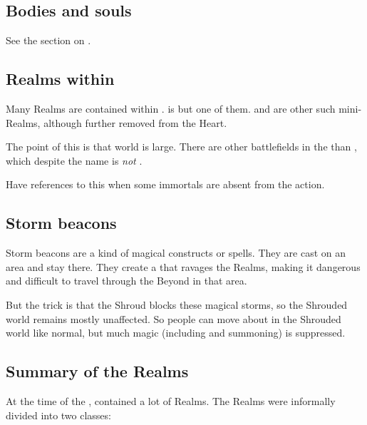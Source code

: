 \subsection{Bodies and souls}
See the section on . 









\subsection{Realms within \Miith}
Many Realms are contained within \Miith{}. 
 is but one of them. 
\Nyx{} and \Machai{} are other such mini-Realms, although further removed from the Heart. 

The point of this is that world is large. 
There are other battlefields in the  than \Azmith, which despite the name is \emph{not} . 

Have references to this when some immortals are absent from the action. 









\subsection{Storm beacons}
Storm beacons are a kind of magical constructs or spells. 
They are cast on an area and stay there. 
They create a  that ravages the Realms, making it dangerous and difficult to travel through the Beyond in that area. 

But the trick is that the Shroud blocks these magical storms, so the Shrouded world remains mostly unaffected. 
So people can move about in the Shrouded world like normal, but much magic (including  and summoning) is suppressed. 









\subsection{Summary of the Realms}
At the time of the \thirdbanewar, \Miith contained a lot of Realms. 
The \Miithian{} Realms were informally divided into two classes: 

